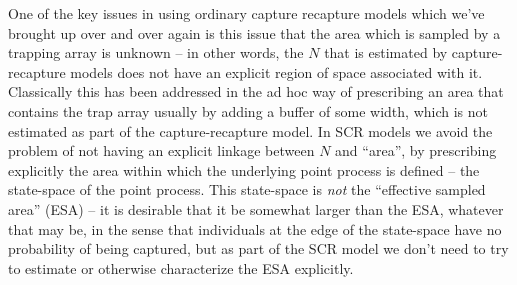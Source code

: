 {One of the key issues in using ordinary capture recapture models which
we've brought up over and over again is this issue that the area which
is sampled by a trapping array is unknown -- in other words, the $N$
that is estimated by capture-recapture models does not have an
explicit region of space associated with it.  Classically this has
been addressed in the ad hoc way of prescribing an area that contains
the trap array usually by adding a buffer of some width, which is not
estimated as part of the capture-recapture model.  In SCR models we
avoid the problem of not having an explicit linkage between $N$ and
``area'', by prescribing explicitly the area within which the
underlying point process is defined -- the state-space of the point
process.  This state-space is {\it not} the ``effective sampled area'' (ESA)
-- it is desirable that it be somewhat larger than the ESA, whatever
that may be, in the sense
that individuals at the edge of the state-space have no probability of
being captured, but as part of the SCR model we don't need to try to
estimate or otherwise characterize the ESA explicitly.

}
